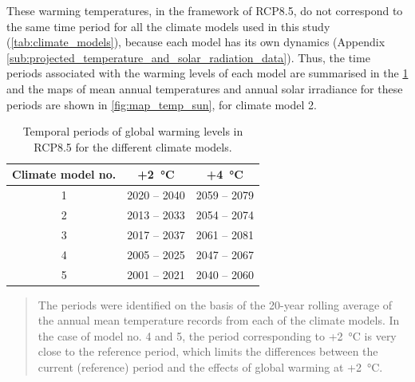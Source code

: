 \documentclass[11pt]{article}
\begin{document}
        These warming temperatures, in the framework of RCP8.5, do not correspond to the same time period for all the climate models used in this study (\ref{tab:climate_models}), because each model has its own dynamics (Appendix \ref{sub:projected_temperature_and_solar_radiation_data}). Thus, the time periods associated with the warming levels of each model are summarised in the \ref{tab:climate_periods} and the maps of mean annual temperatures and annual solar irradiance for these periods are shown in \ref{fig:map_temp_sun}, for climate model 2. 

        \begin{table}[ht]
            \centering
            \caption{\label{tab:climate_periods} Temporal periods of global warming levels in RCP8.5 for the different climate models.}
            \small
            \begin{tabular}{ccc}
                \toprule
                Climate model no. & +\SI{2}{\celsius} & +\SI{4}{\celsius} \\
                \midrule
                1 & 2020 -- 2040 & 2059 -- 2079 \\
                2 & 2013 -- 2033 & 2054 -- 2074 \\
                3 & 2017 -- 2037 & 2061 -- 2081 \\
                4 & 2005 -- 2025 & 2047 -- 2067 \\
                5 & 2001 -- 2021 & 2040 -- 2060 \\
                \bottomrule
                \end{tabular}
            \begin{quote}
                \small\noindent
                The periods were identified on the basis of the 20-year rolling average of the annual mean temperature records from each of the climate models. In the case of model no. 4 and 5, the period corresponding to +\SI{2}{\celsius} is very close to the reference period, which limits the differences between the current (reference) period and the effects of global warming at +\SI{2}{\celsius}.
            \end{quote}
        \end{table}
\end{document}
